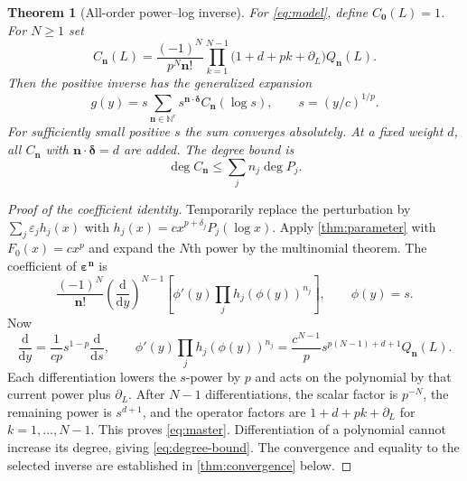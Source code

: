 \documentclass[11pt,a4paper]{article}
\numberwithin{equation}{section}
\newtheorem{theorem}{Theorem}[section]
\theoremstyle{definition}
\newcommand{\N}{\mathbb N}
\newcommand{\dd}{\mathrm d}
\newcommand{\DL}{\partial_L}
\newcommand{\nn}{\boldsymbol n}
\newcommand{\del}{\boldsymbol\delta}
\begin{document}
\begin{theorem}[All-order power--log inverse]\label{thm:master}
For \eqref{eq:model}, define $C_{\boldsymbol0}(L)=1$. For $N\ge1$ set
\begin{equation}\label{eq:master}
 \boxed{\displaystyle
 C_{\nn}(L)=\frac{(-1)^N}{p^N\nn!}
       \prod_{k=1}^{N-1}\bigl(1+d+pk+\DL\bigr)Q_{\nn}(L).}
\end{equation}
Then the positive inverse has the generalized expansion
\begin{equation}\label{eq:master-expansion}
 \boxed{\displaystyle
 g(y)=s\sum_{\nn\in\N^r}s^{\nn\cdot\del}C_{\nn}(\log s),
 \qquad s=(y/c)^{1/p}.}
\end{equation}
For sufficiently small positive $s$ the sum converges absolutely.
At a fixed weight $d$, all $C_{\nn}$ with $\nn\cdot\del=d$ are added.
The degree bound is
\begin{equation}\label{eq:degree-bound}
 \deg C_{\nn}\le\sum_j n_j\deg P_j.
\end{equation}
\end{theorem}
\begin{proof}[Proof of the coefficient identity]
Temporarily replace the perturbation by
$\sum_j\varepsilon_j h_j(x)$ with
$h_j(x)=c x^{p+\delta_j}P_j(\log x)$. Apply
\cref{thm:parameter} with $F_0(x)=c x^p$ and expand the $N$th power by the
multinomial theorem. The coefficient of $\boldsymbol\varepsilon^{\nn}$ is
\begin{equation}\label{eq:before-operator}
 \frac{(-1)^N}{\nn!}\left(\frac{\dd}{\dd y}\right)^{N-1}
 \left[\phi'(y)\prod_j h_j(\phi(y))^{n_j}\right],
 \qquad \phi(y)=s.
\end{equation}
Now
\[
 \frac{\dd}{\dd y}=\frac{1}{cp}s^{1-p}\frac{\dd}{\dd s},
 \qquad
 \phi'(y)\prod_j h_j(\phi(y))^{n_j}
 =\frac{c^{N-1}}p s^{p(N-1)+d+1}Q_{\nn}(L).
\]
Each differentiation lowers the $s$-power by $p$ and acts on the
polynomial by that current power plus $\DL$. After $N-1$ differentiations,
the scalar factor is $p^{-N}$, the remaining power is $s^{d+1}$, and the
operator factors are $1+d+pk+\DL$ for $k=1,\ldots,N-1$. This proves
\eqref{eq:master}. Differentiation of a polynomial cannot increase its
degree, giving \eqref{eq:degree-bound}. The convergence and equality to
the selected inverse are established in \cref{thm:convergence} below.
\end{proof}
\end{document}
